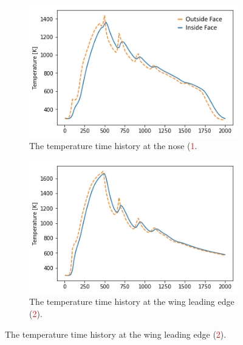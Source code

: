 \begin{figure}[!ht]
	\begin{subfigure}{.5\textwidth}
		\centering
		\includegraphics[width=0.99\linewidth]{figures/A1_uncertainty-analysis/TNoseReturn}
		\caption{The temperature time history at the nose (\textcolor{red}{1}.}
		
	\end{subfigure}
	\begin{subfigure}{.5\textwidth}
		\centering
		\includegraphics[width=0.99\linewidth]{figures/A1_uncertainty-analysis/TLEReturn}
		\caption{The temperature time history at the wing leading edge (\textcolor{red}{2}).}
		

\end{subfigure}
\end{figure}
